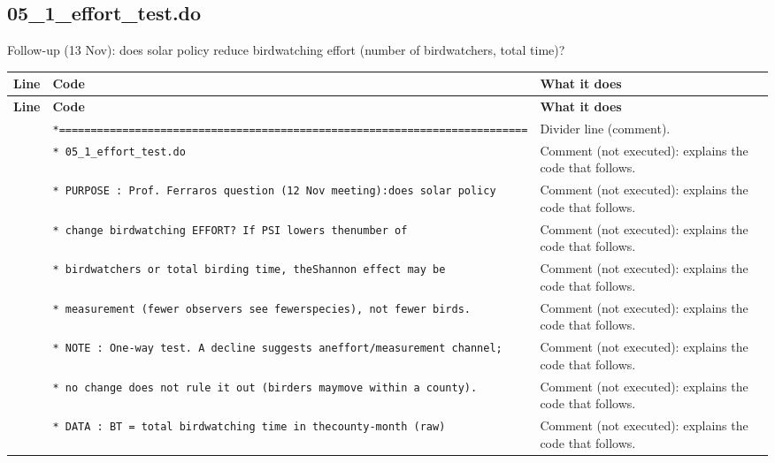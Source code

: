 \documentclass[10pt]{article}
\newcommand{\codetable}[1]{%
{\footnotesize
\begin{longtable}{>{\raggedleft\arraybackslash}p{0.55cm}>{\raggedright\arraybackslash}p{8.3cm}>{\raggedright\arraybackslash}p{8.0cm}}
\toprule \textbf{Line} & \textbf{Code} & \textbf{What it does}\\ \midrule \endfirsthead
\toprule \textbf{Line} & \textbf{Code} & \textbf{What it does}\\ \midrule \endhead
\bottomrule \endfoot
#1
\end{longtable}}}
\begin{document}
\subsection{05\_1\_effort\_test.do}
Follow-up (13 Nov): does solar policy reduce birdwatching effort (number of birdwatchers, total time)?

\codetable{1 & \texttt{*=========================================================\newline \hspace*{1em}=================} & Divider line (comment).\\
2 & \texttt{* 05\_1\_effort\_test.do} & Comment (not executed): explains the code that follows.\\
3 & \texttt{* PURPOSE : Prof. Ferraro\textquotesingle{}s question (12 Nov meeting):\newline \hspace*{1em}does solar policy} & Comment (not executed): explains the code that follows.\\
4 & \texttt{*           change birdwatching EFFORT? If PSI lowers the\newline \hspace*{1em}number of} & Comment (not executed): explains the code that follows.\\
5 & \texttt{*           birdwatchers or total birding time, the\newline \hspace*{1em}Shannon \textquotedbl{}effect\textquotedbl{} may be} & Comment (not executed): explains the code that follows.\\
6 & \texttt{*           measurement (fewer observers see fewer\newline \hspace*{1em}species), not fewer birds.} & Comment (not executed): explains the code that follows.\\
7 & \texttt{* NOTE    : One-{}way test. A decline suggests an\newline \hspace*{1em}effort/measurement channel;} & Comment (not executed): explains the code that follows.\\
8 & \texttt{*           no change does not rule it out (birders may\newline \hspace*{1em}move within a county).} & Comment (not executed): explains the code that follows.\\
9 & \texttt{* DATA    : BT = total birdwatching time in the\newline \hspace*{1em}county-{}month (raw)} & Comment (not executed): explains the code that follows.\\
}
\end{document}
